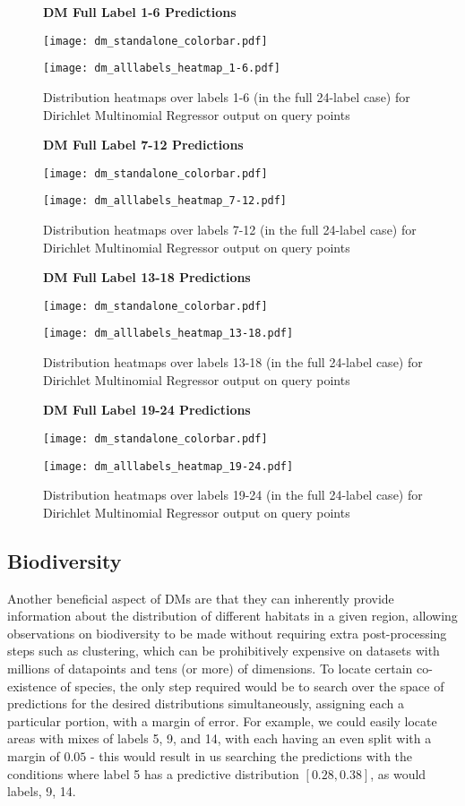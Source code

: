 \begin{figure}[H]
    \textbf{DM Full Label 1-6 Predictions}
    \centerline{\texttt{[image: dm\_standalone\_colorbar.pdf]}}
    \centerline{\texttt{[image: dm\_alllabels\_heatmap\_1-6.pdf]}}
    \caption{Distribution heatmaps over labels 1-6 (in the full 24-label case) for Dirichlet Multinomial Regressor output on query points}
    \label{fig:dm_24-1_label_heatmap}
    \hfill
\end{figure}
\begin{figure}[H]
    \textbf{DM Full Label 7-12 Predictions}
    \centerline{\texttt{[image: dm\_standalone\_colorbar.pdf]}}
    \centerline{\texttt{[image: dm\_alllabels\_heatmap\_7-12.pdf]}}
    \caption{Distribution heatmaps over labels 7-12 (in the full 24-label case) for Dirichlet Multinomial Regressor output on query points}
    \label{fig:dm_24-2_label_heatmap}
    \hfill
\end{figure}
\begin{figure}[H]
    \textbf{DM Full Label 13-18 Predictions}
    \centerline{\texttt{[image: dm\_standalone\_colorbar.pdf]}}
    \centerline{\texttt{[image: dm\_alllabels\_heatmap\_13-18.pdf]}}
    \caption{Distribution heatmaps over labels 13-18 (in the full 24-label case) for Dirichlet Multinomial Regressor output on query points}
    \label{fig:dm_24-3_label_heatmap}
    \hfill
\end{figure}
\begin{figure}[H]
    \textbf{DM Full Label 19-24 Predictions}
    \centerline{\texttt{[image: dm\_standalone\_colorbar.pdf]}}
    \centerline{\texttt{[image: dm\_alllabels\_heatmap\_19-24.pdf]}}
    \caption{Distribution heatmaps over labels 19-24 (in the full 24-label case) for Dirichlet Multinomial Regressor output on query points}
    \label{fig:dm_24-4_label_heatmap}
    \hfill
\end{figure}

\subsection{Biodiversity}

Another beneficial aspect of DMs are that they can inherently provide information about the distribution of different habitats in a given region, allowing observations on biodiversity to be made without requiring extra post-processing steps such as clustering, which can be prohibitively expensive on datasets with millions of datapoints and tens (or more) of dimensions. To locate certain co-existence of species, the only step required would be to search over the space of predictions for the desired distributions simultaneously, assigning each a particular portion, with a margin of error. For example, we could easily locate areas with mixes of  labels 5, 9, and 14, with each having an even split with a margin of $0.05$ - this would result in us searching the predictions with the conditions where label 5 has a predictive distribution $[0.28, 0.38]$, as would labels, 9, 14. 

